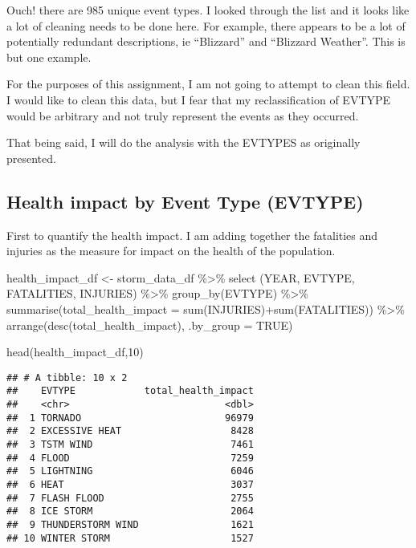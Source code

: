 \documentclass[
]{article}
\newenvironment{Shaded}{\begin{snugshade}}{\end{snugshade}}
\newcommand{\AttributeTok}[1]{\textcolor[rgb]{0.77,0.63,0.00}{#1}}
\newcommand{\ConstantTok}[1]{\textcolor[rgb]{0.00,0.00,0.00}{#1}}
\newcommand{\DecValTok}[1]{\textcolor[rgb]{0.00,0.00,0.81}{#1}}
\newcommand{\FunctionTok}[1]{\textcolor[rgb]{0.00,0.00,0.00}{#1}}
\newcommand{\NormalTok}[1]{#1}
\newcommand{\OtherTok}[1]{\textcolor[rgb]{0.56,0.35,0.01}{#1}}
\newcommand{\SpecialCharTok}[1]{\textcolor[rgb]{0.00,0.00,0.00}{#1}}
\begin{document}
Ouch! there are 985 unique event types. I looked through the list and it
looks like a lot of cleaning needs to be done here. For example, there
appears to be a lot of potentially redundant descriptions, ie
``Blizzard'' and ``Blizzard Weather''. This is but one example.

For the purposes of this assignment, I am not going to attempt to clean
this field. I would like to clean this data, but I fear that my
reclassification of EVTYPE would be arbitrary and not truly represent
the events as they occurred.

That being said, I will do the analysis with the EVTYPES as originally
presented.

\hypertarget{health-impact-by-event-type-evtype}{%
\subsection{Health impact by Event Type
(EVTYPE)}\label{health-impact-by-event-type-evtype}}

First to quantify the health impact. I am adding together the fatalities
and injuries as the measure for impact on the health of the population.

\begin{Shaded}
\begin{Highlighting}[]
\NormalTok{health\_impact\_df }\OtherTok{\textless{}{-}}\NormalTok{ storm\_data\_df }\SpecialCharTok{\%\textgreater{}\%}
      \FunctionTok{select}\NormalTok{ (YEAR, EVTYPE, FATALITIES, INJURIES) }\SpecialCharTok{\%\textgreater{}\%}
      \FunctionTok{group\_by}\NormalTok{(EVTYPE) }\SpecialCharTok{\%\textgreater{}\%} 
      \FunctionTok{summarise}\NormalTok{(}\AttributeTok{total\_health\_impact =} \FunctionTok{sum}\NormalTok{(INJURIES)}\SpecialCharTok{+}\FunctionTok{sum}\NormalTok{(FATALITIES))                  }\SpecialCharTok{\%\textgreater{}\%} 
                \FunctionTok{arrange}\NormalTok{(}\FunctionTok{desc}\NormalTok{(total\_health\_impact), }\AttributeTok{.by\_group =} \ConstantTok{TRUE}\NormalTok{)}

\FunctionTok{head}\NormalTok{(health\_impact\_df,}\DecValTok{10}\NormalTok{)}
\end{Highlighting}
\end{Shaded}

\begin{verbatim}
## # A tibble: 10 x 2
##    EVTYPE            total_health_impact
##    <chr>                           <dbl>
##  1 TORNADO                         96979
##  2 EXCESSIVE HEAT                   8428
##  3 TSTM WIND                        7461
##  4 FLOOD                            7259
##  5 LIGHTNING                        6046
##  6 HEAT                             3037
##  7 FLASH FLOOD                      2755
##  8 ICE STORM                        2064
##  9 THUNDERSTORM WIND                1621
## 10 WINTER STORM                     1527
\end{verbatim}
\end{document}
